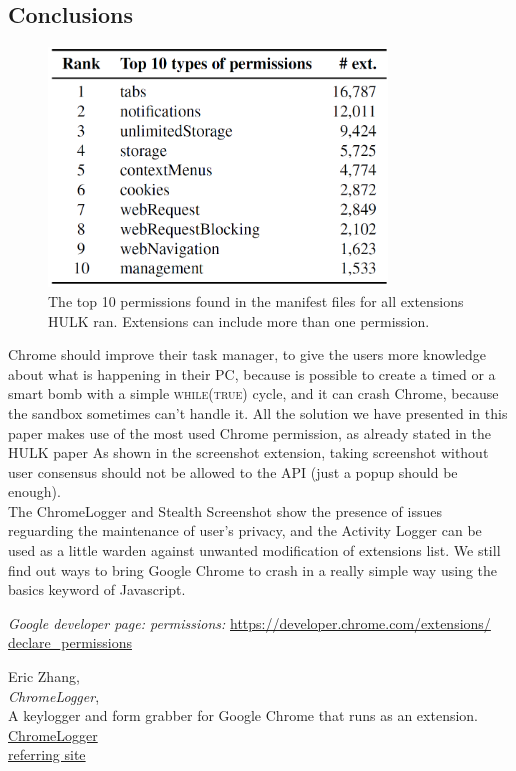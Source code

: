 \documentclass[12pt]{article}
\begin{document}
\begin{multicols}{2}
\section*{Conclusions}
\begin{figure}[H]
	\begin{center}
		\includegraphics[width=9cm]{permission.png}
		\caption{The top 10 permissions found in the manifest
			files for all extensions HULK ran. Extensions can include			
			more than one permission.}
	\end{center}
\end{figure}
Chrome should improve their task manager, to give the users more knowledge about what is happening in their PC, because is possible to create a timed or a smart bomb with a simple \textsc{while(true)} cycle, and it can crash Chrome, because the sandbox sometimes can't handle it.
All the solution we have presented in this paper makes use of the most used Chrome permission, as already stated in the HULK paper\cite{HULK}
As shown in the screenshot extension, taking screenshot without user consensus should not be allowed to the API (just a popup should be enough). \\
The ChromeLogger and Stealth Screenshot show the presence of issues reguarding the maintenance of user's privacy, and the Activity Logger can be used as a little warden against unwanted modification of extensions list. We still find out ways to bring Google Chrome to crash in a really simple way using the basics keyword of Javascript.

\begin{thebibliography}{3}
	\emph{Google developer page: permissions:}
	\href{https://developer.chrome.com/extensions/declare_permissions}{https://developer.chrome.com/extensions/\\declare\_permissions}
	
	Eric Zhang,\\
	\emph{ChromeLogger},\\
A keylogger and form grabber for Google Chrome that runs as an extension.\\
\href{https://github.com/Xeroday/ChromeLogger}{ChromeLogger}\\
\href{https://www.ericzhang.me/projects/chromelogger/}{referring site}


\end{thebibliography}
\end{multicols}
\end{document}
